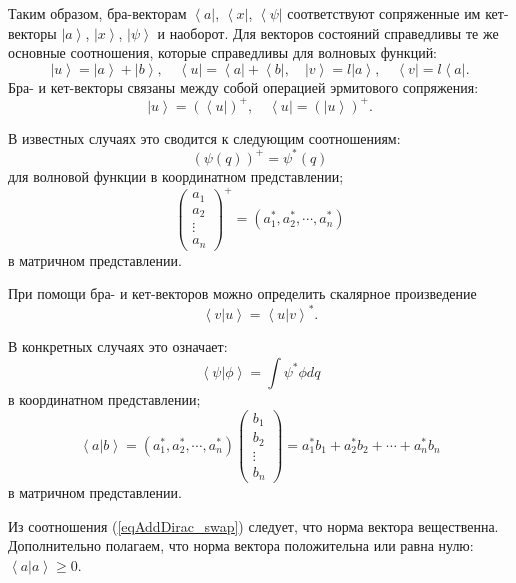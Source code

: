 Таким образом, бра-векторам
$\left< a \right|$,  $\left< x \right|$, $\left< \psi \right|$
соответствуют сопряженные им кет-векторы  
$\left| a \right>$,  $\left| x \right>$, $\left| \psi \right>$
и наоборот. Для векторов состояний справедливы те же основные
соотношения, которые справедливы для волновых функций:  
\begin{equation}
\left| u \right> = \left| a \right>  + \left| b \right>, \quad 
\left< u \right| = \left< a \right|  + \left< b \right|, \quad 
\left| v \right> = l \left| a \right>, \quad  
\left< v \right| = l \left< a \right|.
\end{equation}
Бра- и кет-векторы связаны между собой операцией эрмитового 
сопряжения:
\begin{equation}
\left| u \right> = \left( \left< u \right| \right)^{+}, \quad 
\left< u \right| = \left( \left| u \right> \right)^{+}.
\end{equation}

В известных случаях это сводится к следующим соотношениям:
\[
\left( \psi\left( q \right) \right)^{+} = \psi^{*}\left( q \right)
\]
для волновой функции в координатном представлении;
\[
\left(
\begin{array} {c} 
a_1 \\
a_2 \\
\vdots \\
a_n
\end{array}
 \right)^{+} = 
\left( a_1^{*}, a_2^{*}, \cdots, a_n^{*}\right)
\]
в матричном представлении.

При помощи бра- и кет-векторов можно определить скалярное 
произведение
\begin{equation}
\left< v \right|\left. u \right> = \left< u \right|\left. v \right>^{*}.
\label{eqAddDirac_swap}
\end{equation}

В конкретных случаях это означает:
\[
\left< \psi \right|\left. \phi \right> = 
\int \psi^{*} \phi dq
\]
в координатном представлении;
\[
\left< a \right|\left. b \right> = 
\left( a_1^{*}, a_2^{*}, \cdots, a_n^{*}\right) 
\left(
\begin{array} {c} 
b_1 \\
b_2 \\
\vdots \\
b_n
\end{array}
 \right) = 
a_1^{*} b_1 +  a_2^{*} b_2 + \cdots + a_n^{*} b_n
\]
в матричном представлении.

Из соотношения (\ref{eqAddDirac_swap}) следует, что норма вектора
вещественна. Дополнительно полагаем, что норма вектора положительна
или равна нулю: 
$\left< a \right|\left. a \right> \geq 0$.

